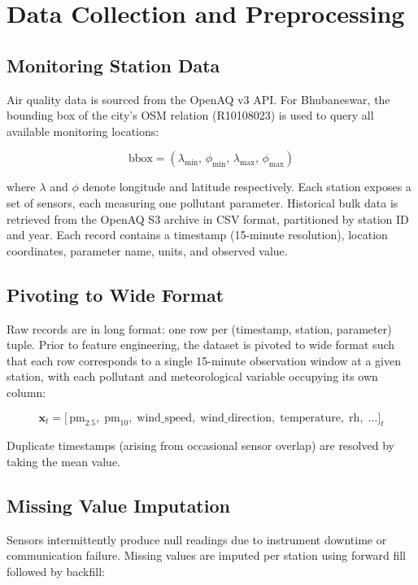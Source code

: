 \documentclass[12pt,a4paper]{article}
\begin{document}
\section{Data Collection and Preprocessing}

\subsection{Monitoring Station Data}

Air quality data is sourced from the OpenAQ v3 API. For Bhubaneswar, the bounding box of the city's OSM relation (R10108023) is used to query all available monitoring locations:

\[
  \text{bbox} = (\lambda_{\min},\,\phi_{\min},\,\lambda_{\max},\,\phi_{\max})
\]

where $\lambda$ and $\phi$ denote longitude and latitude respectively. Each station exposes a set of sensors, each measuring one pollutant parameter. Historical bulk data is retrieved from the OpenAQ S3 archive in CSV format, partitioned by station ID and year. Each record contains a timestamp (15-minute resolution), location coordinates, parameter name, units, and observed value.

\subsection{Pivoting to Wide Format}

Raw records are in long format: one row per (timestamp, station, parameter) tuple. Prior to feature engineering, the dataset is pivoted to wide format such that each row corresponds to a single 15-minute observation window at a given station, with each pollutant and meteorological variable occupying its own column:

\[
  \mathbf{x}_t = \bigl[\,\text{pm}_{2.5},\;\text{pm}_{10},\;\text{wind\_speed},\;\text{wind\_direction},\;\text{temperature},\;\text{rh},\;\ldots\bigr]_t
\]

Duplicate timestamps (arising from occasional sensor overlap) are resolved by taking the mean value.

\subsection{Missing Value Imputation}

Sensors intermittently produce null readings due to instrument downtime or communication failure. Missing values are imputed per station using forward fill followed by backfill:
\end{document}
